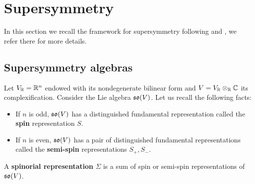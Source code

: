 \documentclass[10pt, oneside]{article}
\begin{document}


\section{Supersymmetry} \label{sec: susy}

In this section we recall the framework for supersymmetry following \cite{ElliottSafronov} and \cite{DeligneSpinors}, we refer there for more details.

\subsection{Supersymmetry algebras}

Let $V_\mathbb R = \mathbb R^n$ endowed with its nondegenerate bilinear form and $V=V_\mathbb R\otimes_\mathbb R\mathbb C$ its complexification. Consider the Lie algebra $\mathfrak{so}(V)$. Let us recall the following facts:
\begin{itemize}
\item If $n$ is odd, $\mathfrak{so}(V)$ has a distinguished fundamental representation called the {\bf spin} representation $S$.

\item If $n$ is even, $\mathfrak{so}(V)$ has a pair of distinguished fundamental representations called the {\bf semi-spin} representations $S_+, S_-$.
\end{itemize}

\begin{definition}
A {\bf spinorial representation} $\Sigma$ is a sum of spin or semi-spin representations of $\mathfrak{so}(V)$.
\end{definition}
\end{document}
